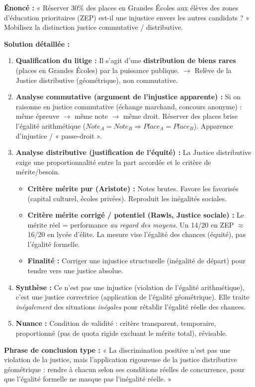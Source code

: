 \documentclass[11pt]{article}
\newcommand{\cle}[1]{{\popxbold\color{popdark}#1}}
\begin{document}
\begin{exoresolu}
\textbf{Énoncé :} « Réserver 30\% des places en Grandes Écoles aux élèves des zones d'éducation prioritaires (ZEP) est-il une injustice envers les autres candidats ? » Mobilisez la distinction justice commutative / distributive.

\tcblower
\textbf{Solution détaillée :}
\begin{enumerate}
    \item \textbf{Qualification du litige :} Il s'agit d'une \textbf{distribution de biens rares} (places en Grandes Écoles) par la puissance publique. $\rightarrow$ Relève de la \cle{Justice distributive} (géométrique), non commutative.
    \item \textbf{Analyse commutative (argument de l'injustice apparente) :} Si on raisonne en \cle{justice commutative} (échange marchand, concours anonyme) : même épreuve $\rightarrow$ même note $\rightarrow$ même droit. Réserver des places brise l'égalité arithmétique ($Note_A = Note_B \Rightarrow Place_A = Place_B$). Apparence d'injustice / « passe-droit ».
    \item \textbf{Analyse distributive (justification de l'équité) :} La Justice distributive exige une \cle{proportionnalité} entre la part accordée et le \cle{critère de mérite/besoin}.
    \begin{itemize}
        \item \textbf{Critère mérite pur (Aristote) :} Notes brutes. Favore les favorisés (capital culturel, écoles privées). Reproduit les inégalités sociales.
        \item \textbf{Critère mérite corrigé / potentiel (Rawls, Justice sociale) :} Le mérite réel = performance \emph{au regard des moyens}. Un 14/20 en ZEP $\approx$ 16/20 en lycée d'élite. La mesure vise l'\cle{égalité des chances} (équité), pas l'égalité formelle.
        \item \textbf{Finalité :} Corriger une \cle{injustice structurelle} (inégalité de départ) pour tendre vers une justice absolue.
    \end{itemize}
    \item \textbf{Synthèse :} Ce n'est pas une \cle{injustice} (violation de l'égalité arithmétique), c'est une \cle{justice correctrice} (application de l'égalité géométrique). Elle traite \emph{inégalement} des situations \emph{inégales} pour rétablir l'égalité réelle des chances.
    \item \textbf{Nuance :} Condition de validité : critère transparent, temporaire, proportionné (pas de quota rigide excluant le mérite total), révisable.
\end{enumerate}
\textbf{Phrase de conclusion type :} « La discrimination positive n'est pas une violation de la justice, mais l'application rigoureuse de la justice distributive géométrique : rendre à chacun selon ses conditions réelles de concurrence, pour que l'égalité formelle ne masque pas l'inégalité réelle. »
\end{exoresolu}
\end{document}
